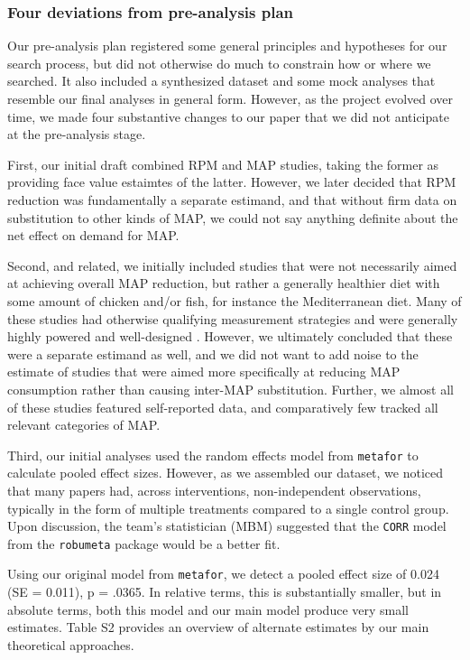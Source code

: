 \documentclass[sn-nature,pdflatex]{sn-jnl}
\begin{document}
\subsubsection{Four deviations from pre-analysis
plan}\label{four-deviations-from-pre-analysis-plan}

Our pre-analysis plan registered some general principles and hypotheses
for our search process, but did not otherwise do much to constrain how
or where we searched. It also included a synthesized dataset and some
mock analyses that resemble our final analyses in general form. However,
as the project evolved over time, we made four substantive changes to
our paper that we did not anticipate at the pre-analysis stage.

First, our initial draft combined RPM and MAP studies, taking the former
as providing face value estaimtes of the latter. However, we later
decided that RPM reduction was fundamentally a separate estimand, and
that without firm data on substitution to other kinds of MAP, we could
not say anything definite about the net effect on demand for MAP.

Second, and related, we initially included studies that were not
necessarily aimed at achieving overall MAP reduction, but rather a
generally healthier diet with some amount of chicken and/or fish, for
instance the Mediterranean diet. Many of these studies had otherwise
qualifying measurement strategies and were generally highly powered and
well-designed \citep{beresford20}. However, we ultimately concluded that
these were a separate estimand as well, and we did not want to add noise
to the estimate of studies that were aimed more specifically at reducing
MAP consumption rather than causing inter-MAP substitution. Further, we
almost all of these studies featured self-reported data, and
comparatively few tracked all relevant categories of MAP.

Third, our initial analyses used the random effects model from
\texttt{metafor} to calculate pooled effect sizes. However, as we
assembled our dataset, we noticed that many papers had, across
interventions, non-independent observations, typically in the form of
multiple treatments compared to a single control group. Upon discussion,
the team's statistician (MBM) suggested that the \texttt{CORR} model
from the \texttt{robumeta} package would be a better fit.

Using our original model from \texttt{metafor}, we detect a pooled
effect size of 0.024 (SE = 0.011), p = .0365. In relative terms, this is
substantially smaller, but in absolute terms, both this model and our
main model produce very small estimates. Table S2 provides an overview
of alternate estimates by our main theoretical approaches.
\end{document}
